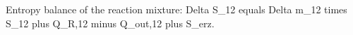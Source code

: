 Entropy balance of the reaction mixture:  
Delta S_12 equals Delta m_12 times S_12 plus Q_R,12 minus Q_out,12 plus S_erz.